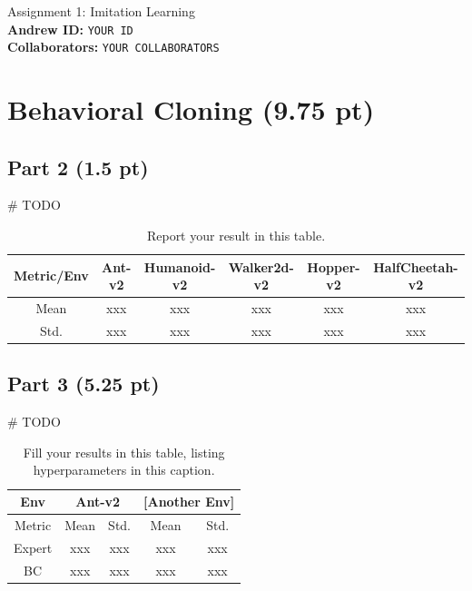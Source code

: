 \documentclass{article}
\begin{document}

\begin{centering}
    {\Large Assignment 1: Imitation Learning} \\
    \vspace{.25cm}
    \textbf{Andrew ID:} \texttt{YOUR ID} \\
    \textbf{Collaborators:} \texttt{YOUR COLLABORATORS}\\ 
\end{centering}

\vspace{.5cm}

\section{Behavioral Cloning (9.75 pt)}
\subsection{Part 2 (1.5 pt)}
\# TODO
\begin{table}[!h]
  \centering
  \caption{Report your result in this table.}
    \begin{tabular}{cccccc}
    \toprule[1.0pt]
    Metric/Env & Ant-v2 & Humanoid-v2 & Walker2d-v2 & Hopper-v2 & HalfCheetah-v2 \\
    \midrule
    Mean  & xxx & xxx & xxx & xxx & xxx \\
    Std.  & xxx & xxx & xxx  & xxx  & xxx \\
    \bottomrule[1.0pt]
    \end{tabular}%
  \label{tab:p2}%
\end{table}%

\subsection{Part 3 (5.25 pt)}
\# TODO
\begin{table}[htbp]
  \centering
  \caption{Fill your results in this table, listing hyperparameters in this caption.}
    \begin{tabular}{ccccc}
    \toprule[1.0pt]
    Env   & \multicolumn{2}{c}{Ant-v2} & \multicolumn{2}{c}{[Another Env]} \\
    \midrule
    Metric & Mean  & Std.  & Mean  & Std. \\
    Expert & xxx & xxx & xxx & xxx \\
    BC    & xxx & xxx & xxx & xxx \\
    \bottomrule[1.0pt]
    \end{tabular}%
  \label{tab:p3}%
\end{table}%
\end{document}
